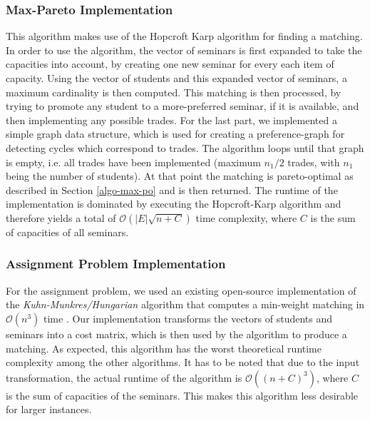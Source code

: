 \subsubsection{Max-Pareto Implementation}\label{impl:maxpo}
This algorithm makes use of the Hopcroft Karp algorithm for finding a matching. In order to use the algorithm, the vector of seminars is first expanded to take the capacities into account, by creating one new seminar for every each item of capacity. Using the vector of students and this expanded vector of seminars, a maximum cardinality is then computed. This matching is then processed, by trying to promote any student to a more-preferred seminar, if it is available, and then implementing any possible trades. For the last part, we implemented a simple graph data structure, which is used for creating a preference-graph for detecting cycles which correspond to trades. The algorithm loops until that graph is empty, i.e. all trades have been implemented (maximum $n_1/2$ trades, with $n_1$ being the number of students). At that point the matching is pareto-optimal as described in Section \ref{algo-max-po} and is then returned. The runtime of the implementation is dominated by executing the Hopcroft-Karp algorithm and therefore yields a total of $\mathcal{O}(|E|\sqrt{n+C})$ time complexity, where $C$ is the sum of capacities of all seminars.

\subsubsection{Assignment Problem Implementation}
For the assignment problem, we used an existing open-source implementation of the \emph{Kuhn-Munkres/Hungarian} algorithm that computes a min-weight matching in $\mathcal{O}(n^3)$ time \cite{HungarianGithub}. Our implementation transforms the vectors of students and seminars into a cost matrix, which is then used by the algorithm to produce a matching. As expected, this algorithm has the worst theoretical runtime complexity among the other algorithms. It has to be noted that due to the input transformation, the actual runtime of the algorithm is $\mathcal{O}((n + C)^3)$, where $C$ is the sum of capacities of the seminars. This makes this algorithm less desirable for larger instances.

